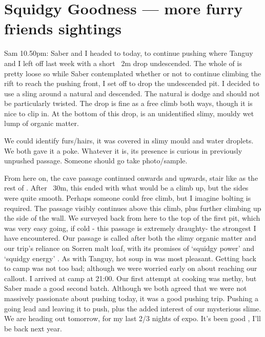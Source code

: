 \section{Squidgy Goodness --- more furry friends sightings}

Sam 10.50pm: Saber and I headed to  today, to continue pushing where Tanguy and I left off last week with a short ~2m drop undescended. The whole of  is pretty loose so while Saber contemplated whether or not to continue climbing the rift to reach the pushing front, I set off to drop the undescended pit.
I decided to use a sling around a natural and descended. The natural is dodge and should not be particularly twisted. The drop is fine as a free climb both ways, though it is nice to clip in. At the bottom of this drop, is an unidentified slimy, mouldy wet lump of organic matter.

We could identify furs/hairs, it was covered in slimy mould and water droplets. We both gave it a poke. Whatever it is, its presence is curious in previously unpushed passage. Someone should go take photo/sample.



From here on, the cave passage continued onwards and upwards, stair like as the rest of . After ~30m, this ended with what would be a climb up, but the sides were quite smooth. Perhaps someone could free climb, but I imagine bolting is required. The passage visibly continues above this climb, plus further climbing up the side of the wall. We surveyed back from here to  the top of the first pit, which was very easy going, if cold  - this passage is extremely draughty- the strongest I have encountered. Our passage is called   after both the slimy organic matter and our trip’s reliance on Sorren malt loaf, with its promises of ‘squidgy power’ and ‘squidgy energy’ . As with Tanguy, hot soup in  was most pleasant.
Getting back to camp was not too bad; although we were worried early on about reaching our callout. I arrived at camp at 21:00. Our first attempt at cooking was methy, but Saber made a good second batch. Although we both agreed that we were not massively passionate about pushing today, it was a good pushing trip. Pushing a going lead and leaving it to push, plus the added interest of our mysterious slime.
We are heading out tomorrow, for my last 2/3 nights of expo. It’s been good , I’ll be back next year.

